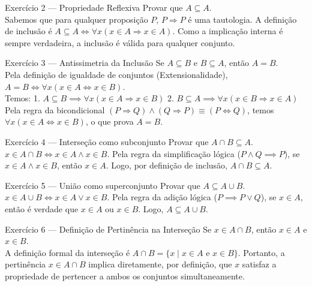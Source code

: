 \documentclass[12pt]{article}
\begin{document}
\begin{block}{Exercício 2 — Propriedade Reflexiva}
Provar que $A \subseteq A$. \\
Sabemos que para qualquer proposição $P$, $P \Rightarrow P$ é uma tautologia. A definição de inclusão é $A \subseteq A \iff \forall x (x \in A \Rightarrow x \in A)$. Como a implicação interna é sempre verdadeira, a inclusão é válida para qualquer conjunto.
\end{block}

\begin{block}{Exercício 3 — Antissimetria da Inclusão}
Se $A \subseteq B$ e $B \subseteq A$, então $A = B$. \\
Pela definição de igualdade de conjuntos (Extensionalidade), $A = B \iff \forall x (x \in A \iff x \in B)$. \\
Temos:
1. $A \subseteq B \implies \forall x (x \in A \Rightarrow x \in B)$
2. $B \subseteq A \implies \forall x (x \in B \Rightarrow x \in A)$ \\
Pela regra da bicondicional $(P \Rightarrow Q) \land (Q \Rightarrow P) \equiv (P \iff Q)$, temos $\forall x (x \in A \iff x \in B)$, o que prova $A = B$.
\end{block}

\begin{block}{Exercício 4 — Interseção como subconjunto}
Provar que $A \cap B \subseteq A$. \\
$x \in A \cap B \iff x \in A \land x \in B$. Pela regra da simplificação lógica ($P \land Q \implies P$), se $x \in A \land x \in B$, então $x \in A$. Logo, por definição de inclusão, $A \cap B \subseteq A$.
\end{block}

\begin{block}{Exercício 5 — União como superconjunto}
Provar que $A \subseteq A \cup B$. \\
$x \in A \cup B \iff x \in A \lor x \in B$. Pela regra da adição lógica ($P \implies P \lor Q$), se $x \in A$, então é verdade que $x \in A$ ou $x \in B$. Logo, $A \subseteq A \cup B$.
\end{block}

\begin{block}{Exercício 6 — Definição de Pertinência na Interseção}
Se $x \in A \cap B$, então $x \in A$ e $x \in B$. \\
A definição formal da interseção é $A \cap B = \{x \mid x \in A \text{ e } x \in B\}$. Portanto, a pertinência $x \in A \cap B$ implica diretamente, por definição, que $x$ satisfaz a propriedade de pertencer a ambos os conjuntos simultaneamente.
\end{block}
\end{document}
